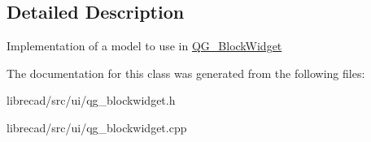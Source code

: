 \subsection{Detailed Description}
Implementation of a model to use in \hyperlink{classQG__BlockWidget}{Q\-G\-\_\-\-Block\-Widget} 

The documentation for this class was generated from the following files\-:\begin{DoxyCompactItemize}
\item 
librecad/src/ui/qg\-\_\-blockwidget.\-h\item 
librecad/src/ui/qg\-\_\-blockwidget.\-cpp\end{DoxyCompactItemize}
